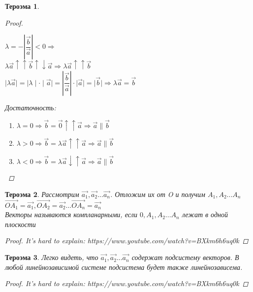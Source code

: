 \documentclass[oneside]{book}
\newtheorem{thm}{Тероэма}[chapter] %
\begin{document}
\begin{itemize}
\begin{enumerate}
\begin{thm}
\begin{proof}
\begin{enumerate}
        $\lambda = - \left| \dfrac{\vec{b}}{\vec{a}}\right|<0 \Longrightarrow$\\
        $\lambda\vec{a} \uparrow \uparrow  \vec{b} \uparrow \downarrow\vec{a} \Longrightarrow \lambda\vec{a} \uparrow \uparrow \vec{b} $\\
        $\mid \lambda\vec{a} \mid = \mid \lambda \mid \cdot \mid \vec{a} \mid = 
        \left| \dfrac{\vec{b}}{\vec{a}}\right| \cdot \mid \vec{a} \mid = \mid \vec{b} \mid\Rightarrow \lambda\vec{a}= \vec{b}$\\
        \end{enumerate}
    \par Достаточность: \\
    \begin{enumerate}
      \item $\lambda=0\Rightarrow \vec{b}=\vec{0}\uparrow \uparrow \vec{a}\Rightarrow \vec{a}\parallel \vec{b}$
      \item $\lambda>0\Rightarrow \vec{b}=\lambda\vec{a}\uparrow \uparrow \vec{a}\Rightarrow \vec{a}\parallel \vec{b}$
      \item  $\lambda<0\Rightarrow \vec{b}=\lambda\vec{a}\downarrow \uparrow \vec{a}\Rightarrow \vec{a}\parallel \vec{b}$
    \end{enumerate}
    \end{proof}
\end{thm}

\begin{thm}
  Рассмотрим $\vec{a_{1}},\vec{a_{2}}...\vec{a_{n}}$. Отложим их от O и получим $A_{1},A_{2}...A_{n}$\\
  $\vec{OA_{1}}=\vec{a_{1}},\vec{OA_{2}}=\vec{a_{2}}...\vec{OA_{n}}=\vec{a_{n}}$\\
  Векторы называются компланарными, если $0,A_{1},A_{2}...A_{n}$ лежат в одной плоскости
\begin{proof}
It's hard to explain: https://www.youtube.com/watch?v=BXkm6h6uq0k
\end{proof}
\end{thm}

\begin{thm}
  Легко видеть, что $\vec{a_{1}},\vec{a_{2}}...\vec{a_{n}}$ содержат подсистему  векторов. В любой линейнозависимой системе подсистема будет также линейнозависема.
\begin{proof}
  It's hard to explain: https://www.youtube.com/watch?v=BXkm6h6uq0k
\end{proof}
\end{thm}


\end{enumerate}
\end{itemize}
\end{document}
